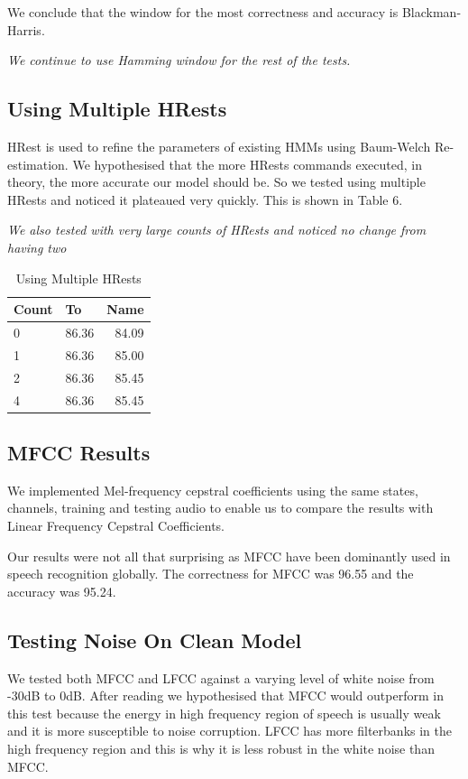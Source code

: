 \documentclass[	DIV=calc,%
							paper=a4,%
							fontsize=9.8pt,%
							twocolumn]{scrartcl}	 					%
\begin{document}
We conclude that the window for the most correctness and accuracy is Blackman-Harris.


\textit{We continue to use Hamming window for the rest of the tests.}
\subsection{Using Multiple HRests}
HRest is used to refine the parameters of existing HMMs using Baum-Welch Re-estimation. We hypothesised that the more HRests commands executed, in theory, the more accurate our model should be. So we tested using multiple HRests and noticed it plateaued very quickly. This is shown in Table 6. 

\textit{We also tested with very large counts of HRests and noticed no change from having two} 
\begin{table}[h]
	\caption{Using Multiple HRests}
	\centering
	\begin{tabular}{llr}
		
		\cmidrule(r){1-3}
		Count & To & Name \\
		\midrule
		0 & 86.36 & 84.09 \\
        1  & 86.36  & 85.00 \\
		2  & 86.36  & 85.45 \\
	    4  & 86.36  & 85.45 \\
		
	\end{tabular}
\end{table}

\subsection{MFCC Results}
We implemented Mel-frequency cepstral coefficients using the same states, channels, training and testing audio to enable us to compare the results with Linear Frequency Cepstral Coefficients.

 Our results were not all that surprising as MFCC have been dominantly used in speech recognition globally. The correctness for MFCC was 96.55 and the accuracy was 95.24.

\subsection{Testing Noise On Clean Model}
We tested both MFCC and LFCC against a varying level of white noise from -30dB to 0dB.
After reading \cite{DBLP:conf/asru/ZhouGDES11} we hypothesised that MFCC would outperform in this test because the energy in high frequency region of speech is usually weak and it is more
susceptible to noise corruption. LFCC has more filterbanks in
the high frequency region and this is why it is less robust in
the white noise than MFCC. 
\end{document}

